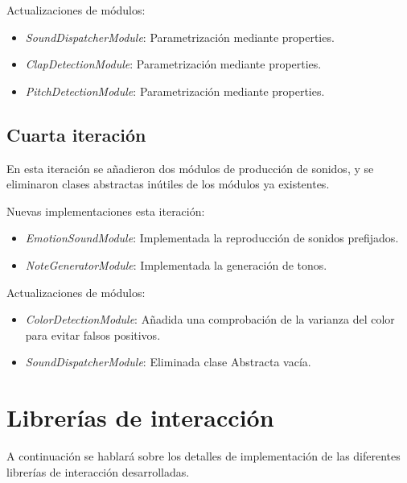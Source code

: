 Actualizaciones de módulos:

\begin{itemize}
	\item \textit{SoundDispatcherModule}: Parametrización mediante properties.
	\item \textit{ClapDetectionModule}: Parametrización mediante properties.
	\item \textit{PitchDetectionModule}: Parametrización mediante properties.

\end{itemize}

\subsection{Cuarta iteración}

En esta iteración se añadieron dos módulos de producción de sonidos, y se eliminaron clases abstractas inútiles de los módulos ya existentes.


Nuevas implementaciones esta iteración:
\begin{itemize}
	\item \textit{EmotionSoundModule}: Implementada la reproducción de sonidos prefijados.
	\item \textit{NoteGeneratorModule}: Implementada la generación de tonos.
\end{itemize}

Actualizaciones de módulos:

\begin{itemize}
	\item \textit{ColorDetectionModule}: Añadida una comprobación de la varianza del color para evitar falsos positivos.
	\item \textit{SoundDispatcherModule}: Eliminada clase Abstracta vacía.
\end{itemize}
\newpage

\section{Librerías de interacción}
A continuación se hablará sobre los detalles de implementación de las diferentes librerías de interacción desarrolladas.
\label{sec:InteractionLibraries}


